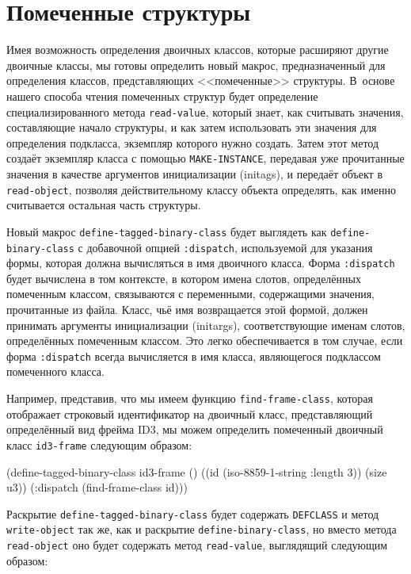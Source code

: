 \section{Помеченные структуры}

Имея возможность определения двоичных классов, которые расширяют другие двоичные классы,
мы готовы определить новый макрос, предназначенный для определения классов, представляющих
<<помеченные>> структуры. В~основе нашего способа чтения помеченных структур будет
определение специализированного метода \lstinline{read-value}, который знает, как считывать
значения, составляющие начало структуры, и как затем использовать эти значения для
определения подкласса, экземпляр которого нужно создать. Затем этот метод создаёт
экземпляр класса с помощью \lstinline{MAKE-INSTANCE}, передавая уже прочитанные значения в
качестве аргументов инициализации (initags), и передаёт объект в \lstinline{read-object},
позволяя действительному классу объекта определять, как именно считывается остальная часть
структуры.

Новый макрос \lstinline{define-tagged-binary-class} будет выглядеть как
\lstinline{define-binary-class} с добавочной опцией \lstinline{:dispatch}, используемой для указания
формы, которая должна вычисляться в имя двоичного класса. Форма \lstinline{:dispatch} будет
вычислена в том контексте, в котором имена слотов, определённых помеченным классом,
связываются с переменными, содержащими значения, прочитанные из файла. Класс, чьё имя
возвращается этой формой, должен принимать аргументы инициализации (initargs),
соответствующие именам слотов, определённых помеченным классом. Это легко обеспечивается в
том случае, если форма \lstinline{:dispatch} всегда вычисляется в имя класса, являющегося
подклассом помеченного класса.

Например, представив, что мы имеем функцию \lstinline{find-frame-class}, которая отображает
строковый идентификатор на двоичный класс, представляющий определённый вид фрейма ID3, мы
можем определить помеченный двоичный класс \lstinline{id3-frame} следующим образом:

\begin{myverb}
(define-tagged-binary-class id3-frame ()
  ((id   (iso-8859-1-string :length 3))
   (size u3))
  (:dispatch (find-frame-class id)))
\end{myverb}

Раскрытие \lstinline{define-tagged-binary-class} будет содержать \lstinline{DEFCLASS} и метод \lstinline{write-object} так же, как и раскрытие \lstinline{define-binary-class}, но вместо метода \lstinline{read-object} оно будет содержать метод \lstinline{read-value}, выглядящий следующим образом:

